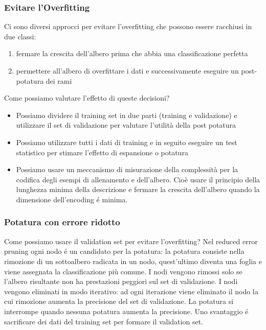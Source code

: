 \documentclass{article}
\begin{document}
\subsubsection{Evitare l'Overfitting}
Ci sono diversi approcci per evitare l'overfitting che possono essere racchiusi in due classi:
\begin{enumerate}
    \item fermare la crescita dell'albero prima che abbia una classificazione perfetta
    \item permettere all'albero di overfittare i dati e successivamente eseguire un post-potatura dei rami
\end{enumerate}
Come possiamo valutare l'effetto di queste decisioni?
\begin{itemize}
    \item Possiamo dividere il training set in due parti (training e validazione) e utilizzare il set di validazione per valutare l'utilità della post potatura
    \item Possiamo utilizzare tutti i dati di training e in seguito eseguire un test statistico per stimare l'effetto di espansione o potatura
    \item Possiamo usare un meccanismo di misurazione della complessità per la codifica degli esempi di allenamento e dell'albero. Cioè usare il principio della lunghezza minima della descrizione e fermare la crescita dell'albero quando la dimensione dell'encoding é minima.
\end{itemize}

\subsubsection{Potatura con errore ridotto}
Come possiamo usare il validation set per evitare l'overfitting? Nel reduced error pruning ogni nodo é un candidato per la potatura: la potatura consiste nella rimozione di un sottoalbero radicata in un nodo, quest'ultimo diventa una foglia e viene assegnata la classificazione più comune. I nodi vengono rimossi solo se l'albero risultante non ha prestazioni peggiori sul set di validazione. I nodi vengono eliminati in modo iterativo: ad ogni iterazione viene eliminato il nodo la cui rimozione aumenta la precisione del set di validazione. La potatura si interrompe quando nessuna potatura aumenta la precisione. Uno svantaggio é sacrificare dei dati del training set per formare il validation set.
\end{document}

